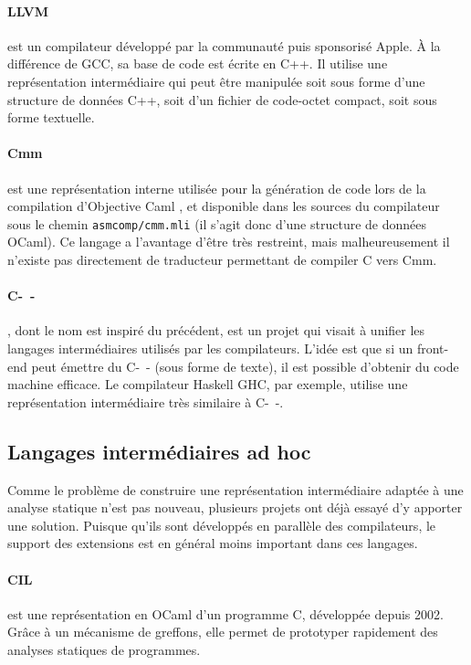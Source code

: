 \paragraph{LLVM}\cite{llvm-pres} est un compilateur développé par la communauté
puis sponsorisé Apple. À la différence de GCC, sa base de code est écrite en
C++. Il utilise une représentation intermédiaire qui peut être manipulée soit
sous forme d'une structure de données C++, soit d'un fichier de code-octet
compact, soit sous forme textuelle.

\paragraph{Cmm} est une représentation interne utilisée pour la génération de
code lors de la compilation d'Objective Caml  , et disponible
dans les sources du compilateur sous le chemin \texttt{asmcomp/cmm.mli} (il
s'agit donc d'une structure de données OCaml). Ce langage a l'avantage d'être
très restreint, mais malheureusement il n'existe pas directement de traducteur
permettant de compiler C vers Cmm.

\paragraph{C-~-}\cite{spjcmm} , dont le nom est inspiré du précédent,
est un projet qui visait à unifier les langages intermédiaires utilisés par les
compilateurs. L'idée est que si un front-end peut émettre du C-~- (sous forme de
texte), il est possible d'obtenir du code machine efficace. Le compilateur
Haskell GHC, par exemple, utilise une représentation intermédiaire très
similaire à C-~-.

\subsection*{Langages intermédiaires ad hoc}

Comme le problème de construire une représentation intermédiaire adaptée à une
analyse statique n'est pas nouveau, plusieurs projets ont déjà essayé d'y
apporter une solution. Puisque qu'ils sont développés en parallèle des
compilateurs, le support des extensions est en général moins important dans ces
langages.

\paragraph{CIL}\cite{NeculaCil}  est une représentation en
OCaml d'un programme C, développée depuis 2002. Grâce à un mécanisme de
greffons, elle permet de prototyper rapidement des analyses statiques de
programmes.


